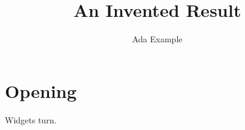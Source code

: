 \documentclass[12pt,twocolumn]{inventedplain}
\title{An Invented Result}
\author{Ada Example}
\begin{document}
\maketitle
\section{Opening}
Widgets turn.
\end{document}
